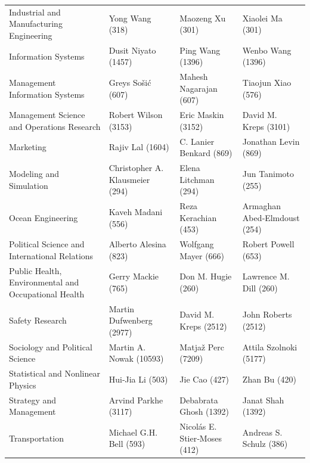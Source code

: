 \documentclass[
  12pt,
]{article}
\begin{document}
\begin{table}[H]
\begin{tabular}[t]{llll}
Industrial and Manufacturing Engineering & Yong Wang (318) & Maozeng Xu (301) & Xiaolei Ma (301)\\
Information Systems & Dusit Niyato (1457) & Ping Wang (1396) & Wenbo Wang (1396)\\
Management Information Systems & Greys Sošić (607) & Mahesh Nagarajan (607) & Tiaojun Xiao (576)\\
Management Science and Operations Research & Robert Wilson (3153) & Eric Maskin (3152) & David M. Kreps (3101)\\
Marketing & Rajiv Lal (1604) & C. Lanier Benkard (869) & Jonathan Levin (869)\\
Modeling and Simulation & Christopher A. Klausmeier (294) & Elena Litchman (294) & Jun Tanimoto (255)\\
Ocean Engineering & Kaveh Madani (556) & Reza Kerachian (453) & Armaghan Abed‐Elmdoust (254)\\
Political Science and International Relations & Alberto Alesina (823) & Wolfgang Mayer (666) & Robert Powell (653)\\
Public Health, Environmental and Occupational Health & Gerry Mackie (765) & Don M. Hugie (260) & Lawrence M. Dill (260)\\
Safety Research & Martin Dufwenberg (2977) & David M. Kreps (2512) & John Roberts (2512)\\
Sociology and Political Science & Martin A. Nowak (10593) & Matjaž Perc (7209) & Attila Szolnoki (5177)\\
Statistical and Nonlinear Physics & Hui‐Jia Li (503) & Jie Cao (427) & Zhan Bu (420)\\
Strategy and Management & Arvind Parkhe (3117) & Debabrata Ghosh (1392) & Janat Shah (1392)\\
Transportation & Michael G.H. Bell (593) & Nicolás E. Stier‐Moses (412) & Andreas S. Schulz (386)\\
\bottomrule
\end{tabular}
\end{table}

\newpage
\end{document}
